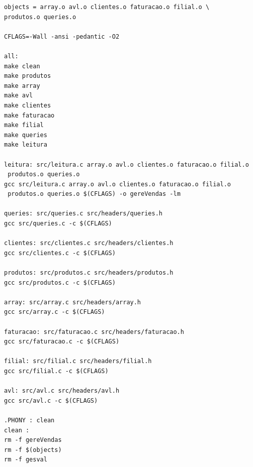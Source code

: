 \begin{verbatim}
objects = array.o avl.o clientes.o faturacao.o filial.o \
produtos.o queries.o 

CFLAGS=-Wall -ansi -pedantic -O2

all:
make clean
make produtos
make array
make avl
make clientes
make faturacao
make filial
make queries
make leitura

leitura: src/leitura.c array.o avl.o clientes.o faturacao.o filial.o
 produtos.o queries.o 
gcc src/leitura.c array.o avl.o clientes.o faturacao.o filial.o
 produtos.o queries.o $(CFLAGS) -o gereVendas -lm

queries: src/queries.c src/headers/queries.h
gcc src/queries.c -c $(CFLAGS)

clientes: src/clientes.c src/headers/clientes.h
gcc src/clientes.c -c $(CFLAGS)

produtos: src/produtos.c src/headers/produtos.h
gcc src/produtos.c -c $(CFLAGS)

array: src/array.c src/headers/array.h
gcc src/array.c -c $(CFLAGS)

faturacao: src/faturacao.c src/headers/faturacao.h
gcc src/faturacao.c -c $(CFLAGS)

filial: src/filial.c src/headers/filial.h
gcc src/filial.c -c $(CFLAGS)

avl: src/avl.c src/headers/avl.h
gcc src/avl.c -c $(CFLAGS)

.PHONY : clean
clean :
rm -f gereVendas
rm -f $(objects)
rm -f gesval
\end{verbatim}
